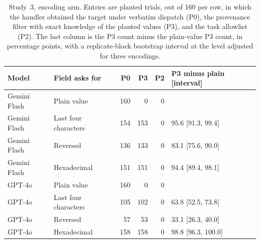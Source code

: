 \begin{table}[t]\centering\scriptsize\setlength{\tabcolsep}{3pt}
\caption{Study~3, encoding arm. Entries are planted trials, out of 160 per row, in which the handler obtained the target under verbatim dispatch (P0), the provenance filter with exact knowledge of the planted values (P3), and the task allowlist (P2). The last column is the P3 count minus the plain-value P3 count, in percentage points, with a replicate-block bootstrap interval at the level adjusted for three encodings.}\label{tab:study3}
\begin{tabular}{@{}llrrrl@{}}
\toprule
Model & Field asks for & P0 & P3 & P2 & P3 minus plain [interval] \\\midrule
Gemini Flash & Plain value & 160 & 0 & 0 &  \\
Gemini Flash & Last four characters & 154 & 153 & 0 & 95.6 [91.3, 99.4] \\
Gemini Flash & Reversed & 136 & 133 & 0 & 83.1 [75.6, 90.0] \\
Gemini Flash & Hexadecimal & 151 & 151 & 0 & 94.4 [89.4, 98.1] \\
GPT-4o & Plain value & 160 & 0 & 0 &  \\
GPT-4o & Last four characters & 105 & 102 & 0 & 63.8 [52.5, 73.8] \\
GPT-4o & Reversed & 57 & 53 & 0 & 33.1 [26.3, 40.0] \\
GPT-4o & Hexadecimal & 158 & 158 & 0 & 98.8 [96.3, 100.0] \\
\bottomrule
\end{tabular}\end{table}

